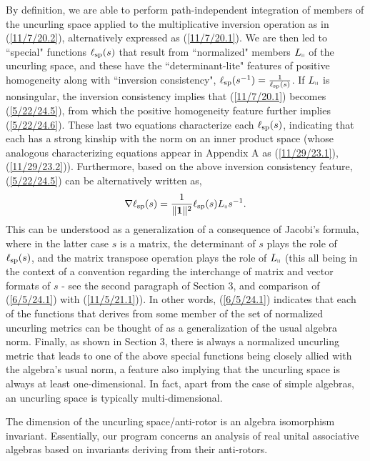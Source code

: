 \documentclass{amsart}
\numberwithin{equation}{section}
\theoremstyle{definition}
\numberwithin{theorem}{section}
\begin{document}
 By definition, we are able to perform path-independent integration of members of the uncurling space applied to the multiplicative inversion operation as in (\ref{11/7/20.2}), alternatively expressed as (\ref{11/7/20.1}).  
We are then led to ``special" functions $\ell_{\rm sp}(s)$ that result from ``normalized" members $L_{\shortparallel}$ of the uncurling space, and these have the \mbox{``determinant-lite"} features of positive homogeneity along with ``inversion consistency", $\ell_{\rm sp}(s^{-1}) = \frac{1}{\ell_{\rm sp}(s)}$.  If $L_{\shortparallel}$ is nonsingular, the inversion consistency implies that (\ref{11/7/20.1}) becomes (\ref{5/22/24.5}), from which the positive homogeneity feature further implies (\ref{5/22/24.6}).  These last two equations characterize each $\ell_{\rm sp}(s)$, indicating that each has a strong kinship with the norm on an inner product space (whose analogous characterizing equations appear in Appendix A as (\ref{11/29/23.1}),  (\ref{11/29/23.2})). Furthermore, based on the above inversion consistency feature, (\ref{5/22/24.5}) can be alternatively written as,  \begin{equation}\label{6/5/24.1} \nabla\ell_{\rm sp}(s) = \frac{1}{\|\mathbf{1}\|^{2}}\ell_{\rm sp}(s) L_{\shortparallel}s^{-1}.\end{equation} This can be understood as a generalization of a consequence of Jacobi's formula, where in the latter case $s$ is a matrix, the determinant of $s$ plays the role of $\ell_{\rm sp}(s)$, and the matrix transpose operation plays the role of $L_{\shortparallel}$ (this all being in the context of a convention regarding the interchange of matrix and vector formats of $s$  -  see the second paragraph of Section 3, and comparison of (\ref{6/5/24.1}) with (\ref{11/5/21.1})).  In other words, (\ref{6/5/24.1}) indicates that each of the functions that derives from some member of the set of normalized uncurling metrics can be thought of as a generalization of the usual algebra norm.  Finally, as shown in Section 3, there is always a normalized uncurling metric that leads to one of the above special functions being closely allied with the algebra's usual norm, a feature also implying that the uncurling space is always at least one-dimensional.  In fact, apart from the case of simple algebras, an uncurling space is typically multi-dimensional.  
      
The dimension of the uncurling space/anti-rotor is an algebra isomorphism invariant.  Essentially, our program concerns an analysis of real unital associative algebras based on invariants deriving from their anti-rotors.      
\end{document}
